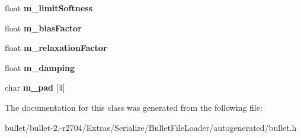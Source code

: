 \begin{DoxyCompactItemize}
\item 
\hypertarget{class_bullet_1_1bt_cone_twist_constraint_data_a74dacc4763baf212020d63869a90c232}{float {\bfseries m\+\_\+limit\+Softness}}\label{class_bullet_1_1bt_cone_twist_constraint_data_a74dacc4763baf212020d63869a90c232}

\item 
\hypertarget{class_bullet_1_1bt_cone_twist_constraint_data_ad009e195e809583f16f86bf08e0ec946}{float {\bfseries m\+\_\+bias\+Factor}}\label{class_bullet_1_1bt_cone_twist_constraint_data_ad009e195e809583f16f86bf08e0ec946}

\item 
\hypertarget{class_bullet_1_1bt_cone_twist_constraint_data_abb295fe4cf738f6775b76fd5cab38daf}{float {\bfseries m\+\_\+relaxation\+Factor}}\label{class_bullet_1_1bt_cone_twist_constraint_data_abb295fe4cf738f6775b76fd5cab38daf}

\item 
\hypertarget{class_bullet_1_1bt_cone_twist_constraint_data_a9101b5c889a9a9de41f0425a3a50e1c3}{float {\bfseries m\+\_\+damping}}\label{class_bullet_1_1bt_cone_twist_constraint_data_a9101b5c889a9a9de41f0425a3a50e1c3}

\item 
\hypertarget{class_bullet_1_1bt_cone_twist_constraint_data_a46f21720633546acaba3d06fb608d467}{char {\bfseries m\+\_\+pad} \mbox{[}4\mbox{]}}\label{class_bullet_1_1bt_cone_twist_constraint_data_a46f21720633546acaba3d06fb608d467}

\end{DoxyCompactItemize}


The documentation for this class was generated from the following file\+:\begin{DoxyCompactItemize}
\item 
bullet/bullet-\/2.-\/r2704/\+Extras/\+Serialize/\+Bullet\+File\+Loader/autogenerated/bullet.\+h\end{DoxyCompactItemize}
